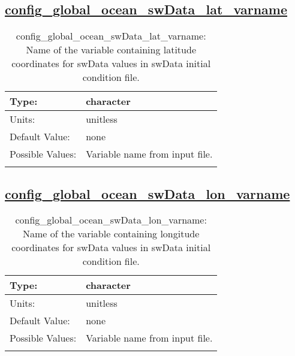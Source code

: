 \subsection[config\_global\_ocean\_swData\_lat\_varname]{\hyperref[sec:nm_tab_global_ocean]{config\_global\_ocean\_swData\_lat\_varname}}
\label{subsec:nm_sec_config_global_ocean_swData_lat_varname}
\begin{center}
\begin{longtable}{| p{2.0in} || p{4.0in} |}
    \hline
    Type: & character \\
    \hline
    Units: & \si{unitless} \\
    \hline
    Default Value: & none \\
    \hline
    Possible Values: & Variable name from input file. \\
    \hline
    \caption{config\_global\_ocean\_swData\_lat\_varname: Name of the variable containing latitude coordinates for swData values in swData initial condition file.}
\end{longtable}
\end{center}
\subsection[config\_global\_ocean\_swData\_lon\_varname]{\hyperref[sec:nm_tab_global_ocean]{config\_global\_ocean\_swData\_lon\_varname}}
\label{subsec:nm_sec_config_global_ocean_swData_lon_varname}
\begin{center}
\begin{longtable}{| p{2.0in} || p{4.0in} |}
    \hline
    Type: & character \\
    \hline
    Units: & \si{unitless} \\
    \hline
    Default Value: & none \\
    \hline
    Possible Values: & Variable name from input file. \\
    \hline
    \caption{config\_global\_ocean\_swData\_lon\_varname: Name of the variable containing longitude coordinates for swData values in swData initial condition file.}
\end{longtable}
\end{center}
